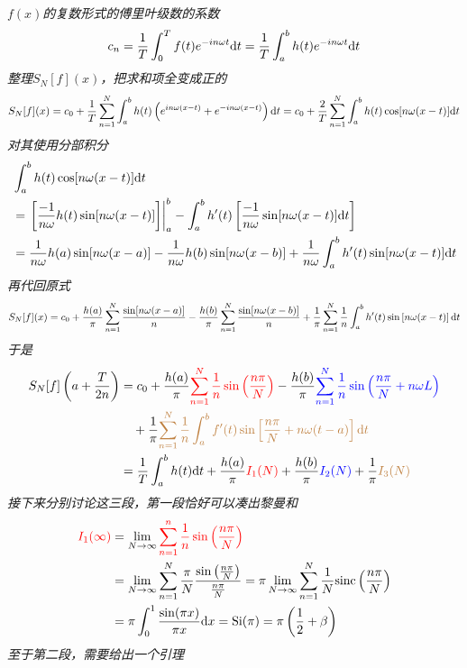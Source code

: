 \textit{
    \(f(x)\)的复数形式的傅里叶级数的系数
    \[c_n = \frac{1}{T} \int_{0}^{T} f(t)e^{-in\omega t}{\rm d}t = \frac{1}{T} \int_{a}^{b}h(t)e^{-in\omega t}{\rm d}t\]
    整理\(S_N[f](x)\)，把求和项全变成正的
    \[S_N[f](x) = c_0+\frac{1}{T}\sum_{n=1}^{N}\int_{a}^{b}h(t)\left(e^{in\omega(x-t)}+e^{-in\omega(x-t)}\right){\rm d}t = c_0+\frac{2}{T}\sum_{n=1}^{N}\int_{a}^{b} h(t)\cos[n\omega(x-t)]{\rm d}t\]
    对其使用分部积分
    \begin{align*}
        & \int_{a}^{b}h(t)\cos[n\omega(x-t)]{\rm d}t \\
        &= \left.\left[\frac{-1}{n\omega}h(t)\sin[n\omega(x-t)]\right]\right|_{a}^{b}-\int_{a}^{b} h'(t)\left[\frac{-1}{n\omega}\sin[n\omega(x-t)]{\rm d}t\right] \\
        &= \frac{1}{n\omega}h(a)\sin[n\omega(x-a)] - \frac{1}{n\omega}h(b)\sin[n\omega(x-b)] + \frac{1}{n\omega}\int_{a}^{b}h'(t)\sin[n\omega(x-t)]{\rm d}t
    \end{align*}
    再代回原式
    \[S_N[f](x) = c_0+\frac{h(a)}{\pi}\sum_{n=1}^{N}\frac{\sin[n\omega(x-a)]}{n} - \frac{h(b)}{\pi}\sum_{n=1}^{N}\frac{\sin[n\omega(x-b)]}{n} + \frac{1}{\pi}\sum_{n=1}^{N}\frac{1}{n}\int_{a}^{b}h'(t)\sin\left[n\omega(x-t)\right]{\rm d}t\]
    于是
    \begin{align*}
        S_N[f]\left(a+\frac{T}{2n}\right) &= c_0 +\frac{h(a)}{\pi}{\color{red}\sum_{n=1}^{N}\frac{1}{n}\sin\left(\frac{n\pi}{N}\right)} 
        -\frac{h(b)}{\pi}{\color{blue}\sum_{n=1}^{N}\frac{1}{n}\sin\left(\frac{n\pi}{N}+n\omega L\right)} \\
        & \quad +\frac{1}{\pi}{\color{brown}\sum_{n=1}^{N}\frac{1}{n}\int_{a}^  {b}f'(t)\sin\left[\frac{n\pi}{N}+n\omega(t-a)\right]{\rm d}t} \\
        &= \frac{1}{T}\int_{a}^{b}h(t){\rm d}t + \frac{h(a)}{\pi}{\color{red}I_1(N)}+ \frac{h(b)}{\pi}{\color{blue}I_2(N)} + \frac{1}{\pi}{\color{brown}I_3(N)}
    \end{align*}
    接下来分别讨论这三段，第一段恰好可以凑出黎曼和
    \begin{align*}
        {\color{red}I_1(\infty)} & = \lim_{N \to \infty}{\color{red}\sum_{n=1}^{n}\frac{1}{n}\sin\left(\frac{n\pi}{N}\right)} \\
        &=  \lim_{N \to \infty} \sum_{n=1}^{N}\frac{\pi}{N}\frac{\sin\left(\frac{n\pi}{N}\right)}{\frac{n\pi}{N}}  = \pi \lim_{N\to\infty} \sum_{n=1}^{N}\frac{1}{N}{\rm sinc}\left(\frac{n\pi}{N}\right)\\
        &= \pi\int_{0}^{1}\frac{\sin(\pi x)}{\pi x}{\rm d}x = {\rm Si}(\pi) = \pi\left(\frac{1}{2}+\beta\right)
    \end{align*}
    至于第二段，需要给出一个引理
}
